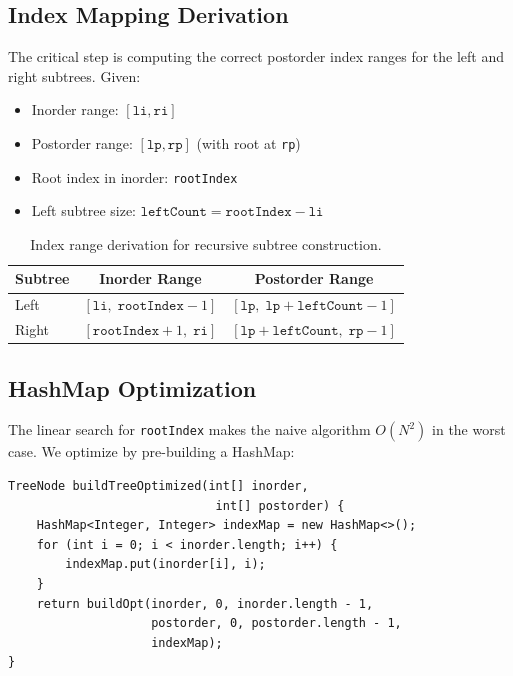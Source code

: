 \documentclass[10pt,journal,compsoc,onecolumn]{IEEEtran}
\begin{document}
\subsection{Index Mapping Derivation}

The critical step is computing the correct postorder index ranges for the left and right subtrees. Given:
\begin{itemize}
    \item Inorder range: $[\texttt{li}, \texttt{ri}]$
    \item Postorder range: $[\texttt{lp}, \texttt{rp}]$ (with root at \texttt{rp})
    \item Root index in inorder: \texttt{rootIndex}
    \item Left subtree size: $\texttt{leftCount} = \texttt{rootIndex} - \texttt{li}$
\end{itemize}

\begin{table}[htbp]
\centering
\begin{tabular}{|l|c|c|}
\hline
\textbf{Subtree} & \textbf{Inorder Range} & \textbf{Postorder Range} \\
\hline
Left & $[\texttt{li},\; \texttt{rootIndex}-1]$ & $[\texttt{lp},\; \texttt{lp}+\texttt{leftCount}-1]$ \\
Right & $[\texttt{rootIndex}+1,\; \texttt{ri}]$ & $[\texttt{lp}+\texttt{leftCount},\; \texttt{rp}-1]$ \\
\hline
\end{tabular}
\caption{Index range derivation for recursive subtree construction.}
\end{table}

\subsection{HashMap Optimization}

The linear search for \texttt{rootIndex} makes the naive algorithm $O(N^2)$ in the worst case. We optimize by pre-building a HashMap:

\begin{verbatim}
TreeNode buildTreeOptimized(int[] inorder, 
                             int[] postorder) {
    HashMap<Integer, Integer> indexMap = new HashMap<>();
    for (int i = 0; i < inorder.length; i++) {
        indexMap.put(inorder[i], i);
    }
    return buildOpt(inorder, 0, inorder.length - 1,
                    postorder, 0, postorder.length - 1,
                    indexMap);
}
\end{verbatim}
\end{document}
